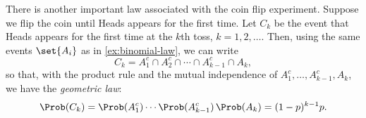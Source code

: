 \begin{example}\label{ex:geometric-law}
There is another important law associated with the coin flip experiment. Suppose we flip the coin until Heads appears for the first time. Let $C_k$ be the event that Heads appears for the first time at the $k$th toss, $k = 1, 2, \ldots$. Then, using the same events $\set{A_i}$ as in \cref{ex:binomial-law}, we can write
\[
  C_k = A_1^c \cap A_2^c \cap \cdots \cap A_{k-1}^c \cap A_k,
\]
so that, with the product rule and the mutual independence of $A_1^c, \ldots, A_{k-1}^c, A_k$, we have the \emph{geometric law}:
\[
  \Prob(C_k) = \Prob(A_1^c) \cdots \Prob(A_{k-1}^c)\,\Prob(A_k) = (1-p)^{k-1} p.
\]
\end{example}
